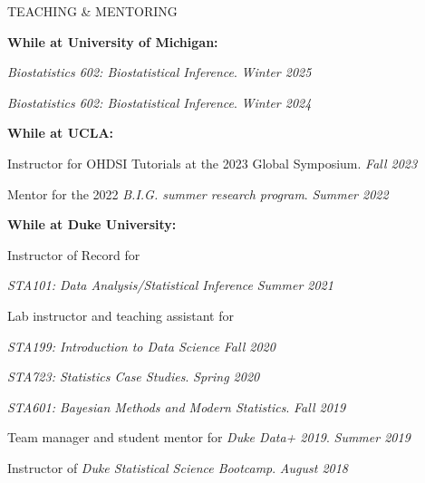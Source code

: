 \documentclass{resume} %
\newcommand{\thisYear}[1]{
	#1
}
\begin{document}
\begin{rSection}{TEACHING \& MENTORING}
	
\hspace*{-0.2in}\textbf{While at University of Michigan:}
	
		\thisYear{
    \emph{Biostatistics 602: Biostatistical Inference}.  \hfill {\em Winter 2025}
}

 \emph{Biostatistics 602: Biostatistical Inference}.  \hfill {\em Winter 2024}

\smallskip 

\hspace*{-0.2in}\textbf{While at UCLA:}
	
	Instructor for OHDSI Tutorials at the 2023 Global Symposium.  \hfill {\em Fall 2023}
		
	Mentor for the 2022 \emph{B.I.G. summer research program}.  \hfill {\em Summer 2022}
	
\smallskip 
	
\hspace*{-0.2in}\textbf{While at Duke University:}
	
	Instructor of Record for 
	
	
	\emph{STA101: Data Analysis/Statistical Inference} \hfill {\em Summer 2021}
	
	Lab instructor and teaching assistant for 
	
	\hspace{0.2in} \emph{STA199: Introduction to Data Science} \hfill {\em Fall 2020}
	
	\hspace{0.2in} \emph{STA723: Statistics Case Studies}. \hfill {\em Spring 2020}
	
	\hspace{0.2in} \emph{STA601: Bayesian Methods and Modern Statistics}. \hfill {\em Fall 2019}
	
	
	Team manager and student mentor for \emph{Duke Data+ 2019}. \hfill {\em Summer 2019}
	
	Instructor of \emph{Duke Statistical Science Bootcamp}. \hfill {\em August 2018}
\end{rSection}
\end{document}
